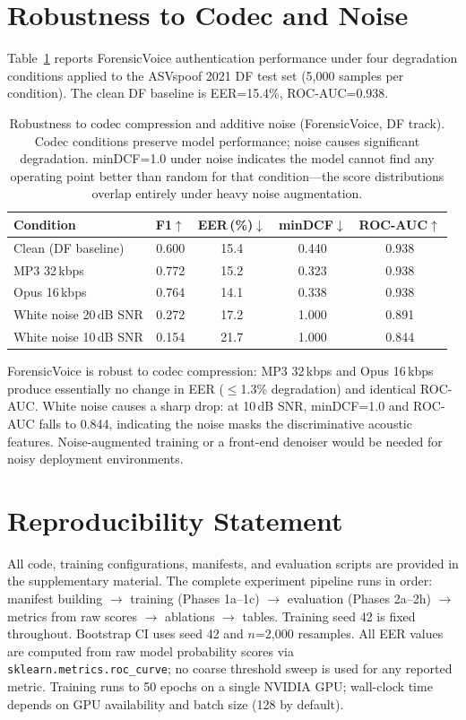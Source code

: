 \documentclass{article}
\newcommand{\fv}{ForensicVoice}
\begin{document}
\section{Robustness to Codec and Noise}
\label{app:robustness}

Table~\ref{tab:robust} reports \fv{} authentication performance under four
degradation conditions applied to the ASVspoof 2021 DF test set (5{,}000
samples per condition). The clean DF baseline is EER=15.4\%, ROC-AUC=0.938.

\begin{table}[h]
  \caption{Robustness to codec compression and additive noise (\fv{}, DF track).
    Codec conditions preserve model performance; noise causes significant
    degradation. minDCF=1.0 under noise indicates the model cannot find
    any operating point better than random for that condition---the score
    distributions overlap entirely under heavy noise augmentation.}
  \label{tab:robust}
  \centering
  \small
  \begin{tabular}{lcccc}
    \toprule
    \textbf{Condition} & \textbf{F1}$\uparrow$ & \textbf{EER\,(\%)}$\downarrow$
      & \textbf{minDCF}$\downarrow$ & \textbf{ROC-AUC}$\uparrow$ \\
    \midrule
    Clean (DF baseline) & 0.600 & 15.4 & 0.440 & 0.938 \\
    \midrule
    MP3 32\,kbps        & 0.772 & 15.2 & 0.323 & 0.938 \\
    Opus 16\,kbps       & 0.764 & 14.1 & 0.338 & 0.938 \\
    \midrule
    White noise 20\,dB SNR & 0.272 & 17.2 & 1.000 & 0.891 \\
    White noise 10\,dB SNR & 0.154 & 21.7 & 1.000 & 0.844 \\
    \bottomrule
  \end{tabular}
\end{table}

\fv{} is robust to codec compression: MP3 32\,kbps and Opus 16\,kbps produce
essentially no change in EER ($\leq$1.3\% degradation) and identical ROC-AUC.
White noise causes a sharp drop: at 10\,dB SNR, minDCF=1.0 and ROC-AUC falls
to 0.844, indicating the noise masks the discriminative acoustic features.
Noise-augmented training or a front-end denoiser would be needed for noisy
deployment environments.

\section{Reproducibility Statement}
All code, training configurations, manifests, and evaluation scripts are
provided in the supplementary material. The complete experiment pipeline runs
in order: manifest building $\to$ training (Phases 1a--1c) $\to$ evaluation
(Phases 2a--2h) $\to$ metrics from raw scores $\to$ ablations $\to$ tables.
Training seed 42 is fixed throughout. Bootstrap CI uses seed 42 and $n$=2{,}000
resamples. All EER values are computed from raw model probability scores via
\texttt{sklearn.metrics.roc\_curve}; no coarse threshold sweep is used for any
reported metric. Training runs to 50 epochs on a single NVIDIA GPU; wall-clock
time depends on GPU availability and batch size (128 by default).

\newpage

\end{document}
